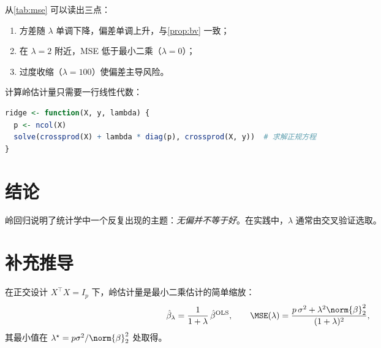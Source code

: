 \documentclass[lang=zh]{mainsub-report}
\begin{document}
从\cref{tab:mse} 可以读出三点：
\begin{enumerate}
  \item 方差随 $\lambda$ 单调下降，偏差单调上升，与\cref{prop:bv} 一致；
  \item 在 $\lambda = 2$ 附近，MSE 低于最小二乘（$\lambda=0$）；
  \item 过度收缩（$\lambda=100$）使偏差主导风险。
\end{enumerate}

计算岭估计量只需要一行线性代数：
\begin{lstlisting}[language=R]
ridge <- function(X, y, lambda) {
  p <- ncol(X)
  solve(crossprod(X) + lambda * diag(p), crossprod(X, y))  # 求解正规方程
}
\end{lstlisting}

\section{结论}

岭回归说明了统计学中一个反复出现的主题：\emph{无偏并不等于好}。在实践中，$\lambda$ 通常由交叉验证选取。

\printbibliography

\appendix
\section{补充推导}\label{app:extra}

在正交设计 $X^\top X = I_p$ 下，岭估计量是最小二乘估计的简单缩放：
\[
  \hat\beta_\lambda = \frac{1}{1+\lambda}\,\hat\beta^{\mathrm{OLS}},
  \qquad
  \MSE(\lambda) = \frac{p\,\sigma^2 + \lambda^2\norm{\beta}_2^2}{(1+\lambda)^2},
\]
其最小值在 $\lambda^\star = p\sigma^2/\norm{\beta}_2^2$ 处取得。
\end{document}
